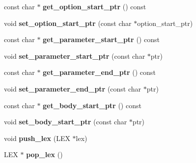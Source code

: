 \begin{DoxyCompactItemize}
\mbox{\label{classsp__parser__data_af4f911a106447b19c032864697a6716d}} 
const char $\ast$ {\bfseries get\+\_\+option\+\_\+start\+\_\+ptr} () const
\item 
\mbox{\label{classsp__parser__data_ae31f9d70f50de7d2482bcd71b67278ef}} 
void {\bfseries set\+\_\+option\+\_\+start\+\_\+ptr} (const char $\ast$option\+\_\+start\+\_\+ptr)
\item 
\mbox{\label{classsp__parser__data_a630d37ca1142dc1ed54a3968f2ec0002}} 
const char $\ast$ {\bfseries get\+\_\+parameter\+\_\+start\+\_\+ptr} () const
\item 
\mbox{\label{classsp__parser__data_a8bf4da82cb200a17f71a344a9c9957e5}} 
void {\bfseries set\+\_\+parameter\+\_\+start\+\_\+ptr} (const char $\ast$ptr)
\item 
\mbox{\label{classsp__parser__data_acb84c0a364cfcaffb48921fa8f15bd08}} 
const char $\ast$ {\bfseries get\+\_\+parameter\+\_\+end\+\_\+ptr} () const
\item 
\mbox{\label{classsp__parser__data_aa41fdd15736a7fb56882dffc4b1a7441}} 
void {\bfseries set\+\_\+parameter\+\_\+end\+\_\+ptr} (const char $\ast$ptr)
\item 
\mbox{\label{classsp__parser__data_a53fda383b67ff836b28879658495c4b6}} 
const char $\ast$ {\bfseries get\+\_\+body\+\_\+start\+\_\+ptr} () const
\item 
\mbox{\label{classsp__parser__data_a839060f76adb03ac1e45faa9f55613c0}} 
void {\bfseries set\+\_\+body\+\_\+start\+\_\+ptr} (const char $\ast$ptr)
\item 
\mbox{\label{classsp__parser__data_a059c22430c4a3a0622230af3aba5db72}} 
void {\bfseries push\+\_\+lex} (L\+EX $\ast$lex)
\item 
\mbox{\label{classsp__parser__data_a508d3a2dcdf123ee81f3f5a75b4b8f81}} 
L\+EX $\ast$ {\bfseries pop\+\_\+lex} ()
\item 

\end{DoxyCompactItemize}
